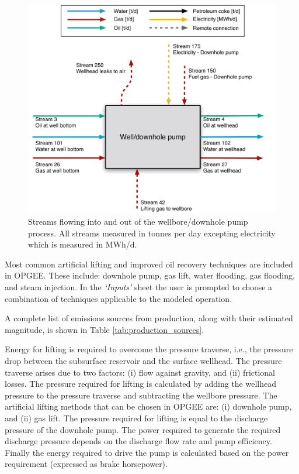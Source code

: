 \documentclass[11pt]{report}
\newcommand{\sheet}[1]{\textit{`{#1}'}}
\begin{document}
\begin{figure}
\includegraphics[width=0.85\columnwidth]{images/Wellbore_downhole_pump_PF.pdf}
\caption{Streams flowing into and out of the wellbore/downhole pump process. All streams measured in tonnes per day excepting electricity which is measured in MWh/d.}
\label{fig:wellbore_PF}
\end{figure}




\clearpage

Most common artificial lifting and improved oil recovery techniques are included in OPGEE. These include: downhole pump, gas lift, water flooding, gas flooding, and steam injection. In the \sheet{Inputs} sheet the user is prompted to choose a combination of techniques applicable to the modeled operation. 

A complete list of emissions sources from production, along with their estimated magnitude, is shown in Table \ref{tab:production_sources}.

Energy for lifting is required to overcome the pressure traverse, i.e., the pressure drop between the subsurface reservoir and the surface wellhead. The pressure traverse arises due to two factors: (i) flow against gravity, and (ii) frictional losses. The pressure required for lifting is calculated by adding the wellhead pressure to the pressure traverse and subtracting the wellbore pressure. The artificial lifting methods that can be chosen in OPGEE are: (i) downhole pump, and (ii) gas lift. The pressure required for lifting is equal to the discharge pressure of the downhole pump. The power required to generate the required discharge pressure depends on the discharge flow rate and pump efficiency. Finally the energy required to drive the pump is calculated based on the power requirement (expressed as brake horsepower). 
\end{document}

